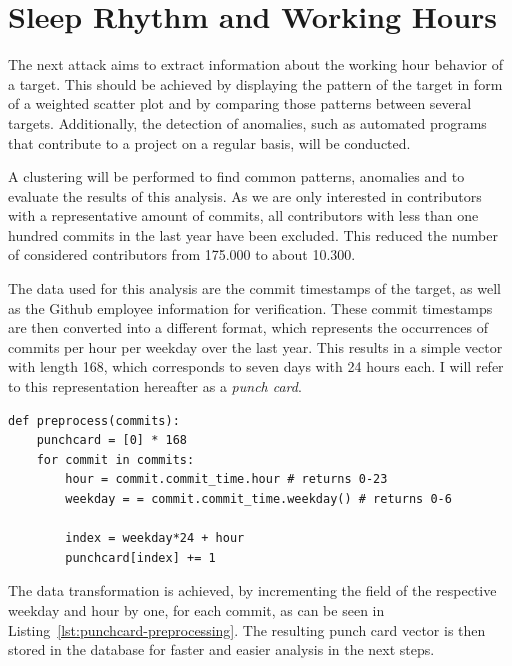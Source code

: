 \section{Sleep Rhythm and Working Hours}\label{punchcard-implementation}

The next attack aims to extract information about the working hour behavior of a target.
This should be achieved by displaying the pattern of the target in form of a weighted scatter plot and by comparing those patterns between several targets.
Additionally, the detection of anomalies, such as automated programs that contribute to a project on a regular basis, will be conducted.

A clustering will be performed to find common patterns, anomalies and to evaluate the results of this analysis.
As we are only interested in contributors with a representative amount of commits, all contributors with less than one hundred commits in the last year have been excluded.
This reduced the number of considered contributors from 175.000 to about 10.300.

The data used for this analysis are the commit timestamps of the target, as well as the Github employee information for verification.
These commit timestamps are then converted into a different format, which represents the occurrences of commits per hour per weekday over the last year.
This results in a simple vector with length 168, which corresponds to seven days with 24 hours each.
I will refer to this representation hereafter as a \emph{punch card}.

\begin{verbatim}
def preprocess(commits):
    punchcard = [0] * 168
    for commit in commits:
        hour = commit.commit_time.hour # returns 0-23
        weekday = = commit.commit_time.weekday() # returns 0-6

        index = weekday*24 + hour
        punchcard[index] += 1

\end{verbatim}
\begingroup
{}\label{lst:puchcard-preprocessing}
\endgroup

The data transformation is achieved, by incrementing the field of the respective weekday and hour by one, for each commit, as can be seen in Listing~\ref{lst:punchcard-preprocessing}.
The resulting punch card vector is then stored in the database for faster and easier analysis in the next steps.

